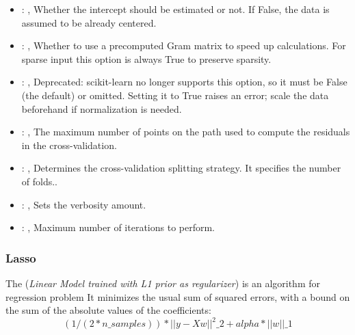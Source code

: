 \begin{itemize}
    \item {}: ,
      Whether the intercept should be estimated or not. If False,
      the data is assumed to be already centered.

    \item {}: ,
      Whether to use a precomputed Gram matrix to speed up calculations.
      For sparse input this option is always True to preserve sparsity.

    \item {}: ,
      Deprecated: scikit-learn no longer supports this option, so it must be False (the default) or
      omitted.                                                  Setting it to True raises an error;
      scale the data beforehand if normalization is needed.

    \item {}: ,
      The maximum number of points on the path used to compute the
      residuals in the cross-validation.

    \item {}: ,
      Determines the cross-validation splitting strategy.
      It specifies the number of folds..

    \item {}: ,
      Sets the verbosity amount.

    \item {}: ,
      Maximum number of iterations to perform.
  \end{itemize}


\subsubsection{Lasso}
  The  (\textit{Linear Model trained with L1 prior as regularizer})
  is an algorithm for regression problem                         It minimizes the usual sum of
  squared errors, with a bound on the sum of the                         absolute values of the
  coefficients:                         \begin{equation}                          (1 / (2 *
  n\_samples)) * ||y - Xw||^2\_2 + alpha * ||w||\_1                         \end{equation}

